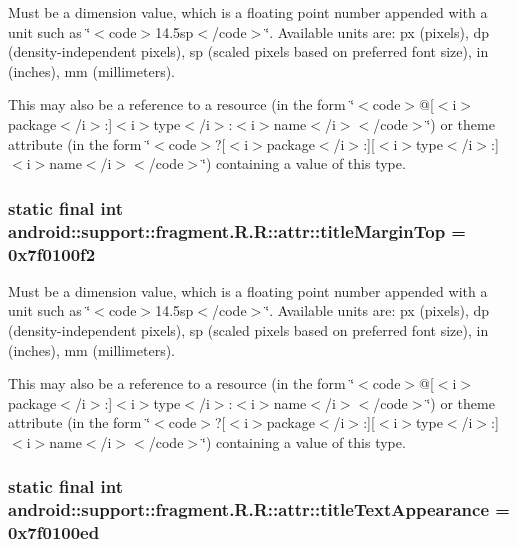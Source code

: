 Must be a dimension value, which is a floating point number appended with a unit such as \char`\"{}$<$code$>$14.5sp$<$/code$>$\char`\"{}. Available units are: px (pixels), dp (density-independent pixels), sp (scaled pixels based on preferred font size), in (inches), mm (millimeters). 

This may also be a reference to a resource (in the form \char`\"{}$<$code$>$@\mbox{[}$<$i$>$package$<$/i$>$:\mbox{]}$<$i$>$type$<$/i$>$:$<$i$>$name$<$/i$>$$<$/code$>$\char`\"{}) or theme attribute (in the form \char`\"{}$<$code$>$?\mbox{[}$<$i$>$package$<$/i$>$:\mbox{]}\mbox{[}$<$i$>$type$<$/i$>$:\mbox{]}$<$i$>$name$<$/i$>$$<$/code$>$\char`\"{}) containing a value of this type. \hypertarget{classandroid_1_1support_1_1fragment_1_1_r_1_1attr_66b7cef201bffe8c304f2607e681f68b}{
\subsubsection[{titleMarginTop}]{\setlength{\rightskip}{0pt plus 5cm}static final int android::support::fragment.R.R::attr::titleMarginTop = 0x7f0100f2}}
\label{classandroid_1_1support_1_1fragment_1_1_r_1_1attr_66b7cef201bffe8c304f2607e681f68b}


Must be a dimension value, which is a floating point number appended with a unit such as \char`\"{}$<$code$>$14.5sp$<$/code$>$\char`\"{}. Available units are: px (pixels), dp (density-independent pixels), sp (scaled pixels based on preferred font size), in (inches), mm (millimeters). 

This may also be a reference to a resource (in the form \char`\"{}$<$code$>$@\mbox{[}$<$i$>$package$<$/i$>$:\mbox{]}$<$i$>$type$<$/i$>$:$<$i$>$name$<$/i$>$$<$/code$>$\char`\"{}) or theme attribute (in the form \char`\"{}$<$code$>$?\mbox{[}$<$i$>$package$<$/i$>$:\mbox{]}\mbox{[}$<$i$>$type$<$/i$>$:\mbox{]}$<$i$>$name$<$/i$>$$<$/code$>$\char`\"{}) containing a value of this type. \hypertarget{classandroid_1_1support_1_1fragment_1_1_r_1_1attr_fd265c15a80c9fc508a70aba6ff65049}{
\subsubsection[{titleTextAppearance}]{\setlength{\rightskip}{0pt plus 5cm}static final int android::support::fragment.R.R::attr::titleTextAppearance = 0x7f0100ed}}
\label{classandroid_1_1support_1_1fragment_1_1_r_1_1attr_fd265c15a80c9fc508a70aba6ff65049}


